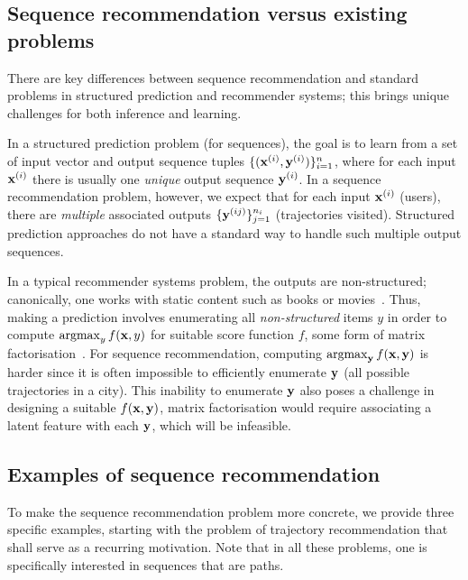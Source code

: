 \secmoveup
\subsection{Sequence recommendation versus existing problems}

There are key differences between sequence recommendation and %
standard problems in structured prediction and recommender systems;
this brings unique challenges for both inference and learning.

In a structured prediction problem (for sequences), the goal is to learn from a set of
input vector and output sequence tuples 
$\{ (\mathbf{x}^{({i})}, \mathbf{y}^{({i})}) \}_{i = 1}^n$, where
for each input $\mathbf{x}^{({i})}$ there is usually one \emph{unique} output sequence $\mathbf{y}^{({i})}$.
In a sequence recommendation problem, however, we expect that %
for each input $\mathbf{x}^{({i})}$ (\eg users),
there are \emph{multiple} associated outputs 
$\{ \mathbf{y}^{({ij})} \}_{j=1}^{n_i}$ (\eg trajectories visited).
Structured prediction approaches do not have a standard way to handle such multiple output sequences.

In a typical recommender systems problem, the outputs are non-structured; canonically, one works with {static} content such as books or movies~\citep{Goldberg:1992,Sarwar:2001,Netflix}.
Thus, making a prediction involves enumerating all {\em non-structured} items $y$ in order to compute $\operatorname*{argmax}_y f(\mathbf{x},y)$ for suitable score function $f$, \eg some form of matrix factorisation~\citep{Koren:2009}.
For sequence recommendation, computing $\operatorname*{argmax}_{\mathbf{y}} f(\mathbf{x},\mathbf{y})$ is harder since it is often impossible to efficiently enumerate $\mathbf{y}$ (\eg all possible trajectories in a city).
This inability to enumerate $\mathbf{y}$ also poses a challenge in designing a suitable $f(\mathbf{x},\mathbf{y})$,
\eg
matrix factorisation
would require associating a latent feature with each $\mathbf{y}$, which will be infeasible.


\secmoveup
\subsection{Examples of sequence recommendation}
\label{sec:trajrec}

To make the sequence recommendation problem more concrete,
we provide three specific examples,
starting with the problem of trajectory recommendation
that shall serve as a recurring motivation.
Note that in all these problems, one is specifically interested in sequences that are paths.


